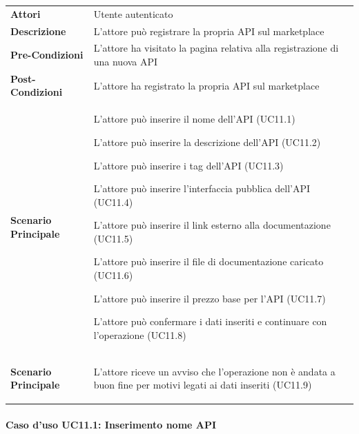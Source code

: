 \begin{longtable}{ l | p{11cm}}
	\hline
	\rowcolor{Gray}
	\multicolumn{2}{c}{UC11 - Registrazione API}\\
	\hline
	
	 \textbf{Attori} & Utente autenticato  \\
	\textbf{Descrizione} & L'attore può registrare la propria API sul marketplace \\
	\textbf{Pre-Condizioni} & L'attore ha visitato la pagina relativa alla registrazione di una nuova API \\
	\textbf{Post-Condizioni} & L'attore ha registrato la propria API sul marketplace \\
	\textbf{Scenario Principale} & 
	\begin{enumerate*}[label=(\arabic*.),itemjoin={\newline}]
		\item L'attore può inserire il nome dell'API (UC11.1)
		\item L'attore può inserire la descrizione dell'API (UC11.2)
		\item L'attore può inserire i tag dell'API (UC11.3)
		\item L'attore può inserire l'interfaccia pubblica dell'API (UC11.4)
		\item L'attore può inserire il link esterno alla documentazione (UC11.5)
		\item L'attore può inserire il file di documentazione caricato  (UC11.6)
		\item L'attore può inserire il prezzo base per l'API (UC11.7)
		\item L'attore può confermare i dati inseriti e continuare con l'operazione (UC11.8)
	\end{enumerate*}\\
	\textbf{Scenario Principale} & 
	\begin{enumerate*}[label=(\arabic*.),itemjoin={\newline}]
		\item L'attore riceve un avviso che l'operazione non è andata a buon fine per motivi legati ai dati inseriti (UC11.9)
	\end{enumerate*}\\
\end{longtable}

\paragraph{Caso d'uso UC11.1: Inserimento nome API}
\label{UC11_1}

